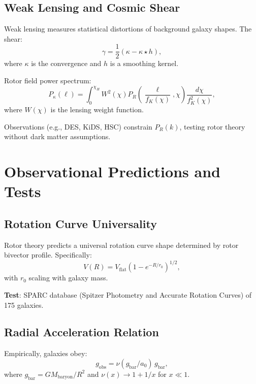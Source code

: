 \documentclass[12pt,a4paper]{article}
\theoremstyle{definition}
\theoremstyle{remark}
\begin{document}
\subsection{Weak Lensing and Cosmic Shear}

Weak lensing measures statistical distortions of background galaxy shapes. The shear:
\begin{equation}
\gamma = \frac{1}{2}(\kappa - \kappa \star h),
\end{equation}
where $\kappa$ is the convergence and $h$ is a smoothing kernel.

Rotor field power spectrum:
\begin{equation}
P_\kappa(\ell) = \int_0^{\chi_H} W^2(\chi) P_R\left(\frac{\ell}{f_K(\chi)}, \chi\right) \frac{d\chi}{f_K^2(\chi)},
\end{equation}
where $W(\chi)$ is the lensing weight function.

Observations (e.g., DES, KiDS, HSC) constrain $P_R(k)$, testing rotor theory without dark matter assumptions.

\section{Observational Predictions and Tests}

\subsection{Rotation Curve Universality}

Rotor theory predicts a universal rotation curve shape determined by rotor bivector profile. Specifically:
\begin{equation}
V(R) = V_{\text{flat}} \left(1 - e^{-R/r_0}\right)^{1/2},
\end{equation}
with $r_0$ scaling with galaxy mass.

\textbf{Test}: SPARC database (Spitzer Photometry and Accurate Rotation Curves) of 175 galaxies.

\subsection{Radial Acceleration Relation}

Empirically, galaxies obey:
\begin{equation}
g_{\text{obs}} = \nu(g_{\text{bar}}/a_0) \, g_{\text{bar}},
\end{equation}
where $g_{\text{bar}} = GM_{\text{baryon}}/R^2$ and $\nu(x) \to 1 + 1/x$ for $x \ll 1$.
\end{document}

